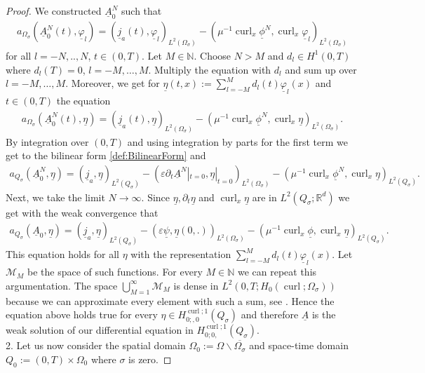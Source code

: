 \documentclass[a4paper,11pt]{article}
\newcommand{\N}{\mathbb N}
\newcommand{\R}{\mathbb R}
\newcommand{\omsig}{\Omega_{\sigma}}
\newcommand{\cu}{\operatorname{curl}}
\renewcommand{\vec}[1]{\underline{#1}}
\begin{document}
\begin{proof}
	We constructed $\vec A_0^N$ such that
	\begin{align*}
		a_{\omsig}(\vec A_0^N(t) , \vec \varphi_l) =(\vec j_a(t) ,\vec \varphi_l)_{L^2(\Omega_\sigma )}-(\mu^{-1}\cu_x \vec \phi^N,\cu_x \vec \varphi_l)_{L^2(\Omega_\sigma)}
	\end{align*}
	for all $l=-N,..,N$, $t\in(0,T)$. Let $M\in \N$. Choose $N>M$ and $d_l\in H^1(0,T)$ where $d_l(T)= 0$, $l=-M,\dots,M$. Multiply the equation with $d_l$ and sum up over $l=-M,\dots,M$.
	Moreover, we get for $\vec \eta(t,x):= \sum\limits_{l=-M}^M d_l(t )\vec \varphi_l(x)$ and  $t\in(0,T)$ the equation
	\begin{align*}
		a_{\omsig}( \vec A_0^N(t) ,\vec \eta) =(\vec j_a(t) ,\vec \eta)_{L^2(\omsig)}-(\mu^{-1}\cu_x \vec \phi^N,\cu_x\vec  \eta)_{L^2(\omsig)}.
	\end{align*}
	By integration over $(0,T)$ and using integration by parts for the first term we get to the bilinear form \eqref{def:BilinearForm} and
	\begin{align*}
		a_{Q_\sigma}(\vec A_0^N,\vec \eta)=(\vec j_a,\vec \eta)_{L^2(Q_\sigma )} - (\varepsilon\partial_t \vec A^N|_{t=0},\vec \eta|_{t=0})_{L^2(\omsig)}-( \mu^{-1}\cu_x \vec \phi^N, \cu_x\vec \eta)_{L^2(Q_\sigma)} .
	\end{align*}
	Next, we take the limit $N\to\infty$. Since $\vec\eta,\partial_t\vec  \eta$ and $\cu_x \vec \eta$ are in $L^2(Q_\sigma;\R^d)$ we get with the weak convergence that
	\begin{align*}
		a_{Q_\sigma}(\vec A_0,\vec \eta) =(\vec j_a,\vec \eta)_{L^2(Q_\sigma)}-(\varepsilon\vec \psi,\vec \eta(0,.))_{L^2(\omsig)} -( \mu^{-1}\cu_x \vec \phi, \cu_x\vec \eta)_{L^2(Q_\sigma)}.
	\end{align*}
	This equation holds for all $\eta$ with the representation $\sum\limits_{l=-M}^M d_l(t )\vec \varphi_l(x)$. Let $\mathcal{M}_M$ be the space of such functions. For every $M\in \N$ we can repeat this argumentation. The space $\bigcup\limits_{M=1}^\infty\mathcal{M}_M$ is dense in $L^2(0,T;H_0(\cu;\Omega_\sigma))$ because we can approximate every element with such a sum, see  \cite[Prop.~23.2d]{zeidler}. Hence the equation above holds true for every $\eta\in  H^{\cu;1}_{0;,0}(Q_\sigma)$ and therefore $\vec A$  is the weak solution of our differential equation in $H^{\cu;1}_{0;0,}(Q_\sigma)$. 
	\vspace*{.2cm}\\
	2. Let us now consider the spatial domain  $\Omega_0:=\Omega\backslash\overline{\omsig}$  and space-time domain $Q_0:=(0,T)\times \Omega_0 $ where $\sigma$ is zero.

\end{proof}
\end{document}
